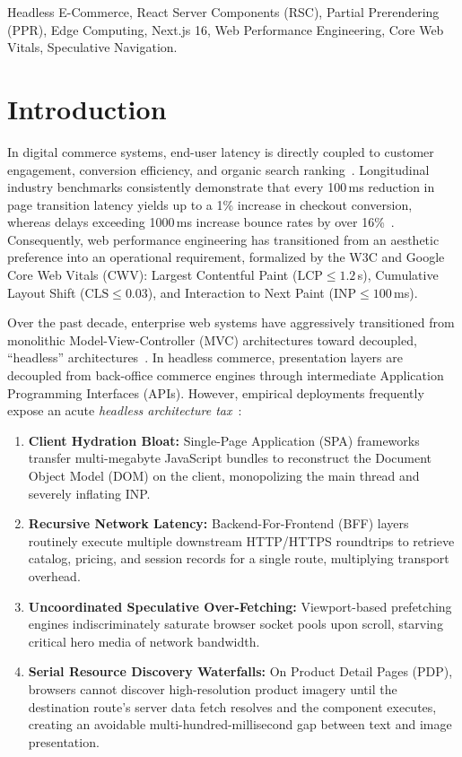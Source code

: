 \documentclass[conference]{IEEEtran}
\begin{document}
\begin{IEEEkeywords}
Headless E-Commerce, React Server Components (RSC), Partial Prerendering (PPR), Edge Computing, Next.js 16, Web Performance Engineering, Core Web Vitals, Speculative Navigation.
\end{IEEEkeywords}

\section{Introduction}
In digital commerce systems, end-user latency is directly coupled to customer engagement, conversion efficiency, and organic search ranking~\cite{google2023cwv}. Longitudinal industry benchmarks consistently demonstrate that every 100\,ms reduction in page transition latency yields up to a 1\% increase in checkout conversion, whereas delays exceeding 1000\,ms increase bounce rates by over 16\%~\cite{ecomlatency2021}. Consequently, web performance engineering has transitioned from an aesthetic preference into an operational requirement, formalized by the W3C and Google Core Web Vitals (CWV): Largest Contentful Paint ($\text{LCP} \le 1.2$\,s), Cumulative Layout Shift ($\text{CLS} \le 0.03$), and Interaction to Next Paint ($\text{INP} \le 100$\,ms).

Over the past decade, enterprise web systems have aggressively transitioned from monolithic Model-View-Controller (MVC) architectures toward decoupled, ``headless'' architectures~\cite{newman2021building}. In headless commerce, presentation layers are decoupled from back-office commerce engines through intermediate Application Programming Interfaces (APIs). However, empirical deployments frequently expose an acute \textit{headless architecture tax}~\cite{microservices2020bff}:
\begin{enumerate}
    \item \textbf{Client Hydration Bloat:} Single-Page Application (SPA) frameworks transfer multi-megabyte JavaScript bundles to reconstruct the Document Object Model (DOM) on the client, monopolizing the main thread and severely inflating INP.
    \item \textbf{Recursive Network Latency:} Backend-For-Frontend (BFF) layers routinely execute multiple downstream HTTP/HTTPS roundtrips to retrieve catalog, pricing, and session records for a single route, multiplying transport overhead.
    \item \textbf{Uncoordinated Speculative Over-Fetching:} Viewport-based prefetching engines indiscriminately saturate browser socket pools upon scroll, starving critical hero media of network bandwidth.
    \item \textbf{Serial Resource Discovery Waterfalls:} On Product Detail Pages (PDP), browsers cannot discover high-resolution product imagery until the destination route's server data fetch resolves and the component executes, creating an avoidable multi-hundred-millisecond gap between text and image presentation.
\end{enumerate}
\end{document}
